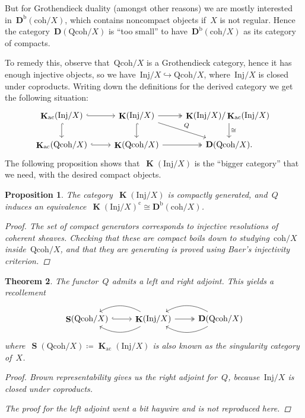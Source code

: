 \documentclass[10pt,a4paper]{article}
\theoremstyle{lecture}
\newtheorem{theorem}{Theorem}
\newtheorem{proposition}[theorem]{Proposition}
\newcommand\ac{\ensuremath{\mathrm{ac}}}
\newcommand\bounded{\ensuremath{\mathrm{b}}}
\newcommand\cc{\ensuremath{\mathrm{c}}}
\newcommand\coh{\ensuremath{\mathrm{coh}}}
\newcommand\derived{\ensuremath{\mathbf{D}}}
\newcommand\Inj{\ensuremath{\mathrm{Inj}}}
\newcommand\Qcoh{\ensuremath{\mathrm{Qcoh}}}
\DeclareMathOperator\KKK{\mathbf{K}}
\DeclareMathOperator\SSing{\mathbf{S}}
\begin{document}
But for Grothendieck duality (amongst other reasons) we are mostly interested in~$\derived^\bounded(\coh/X)$, which contains noncompact objects  if~$X$ is not regular. Hence the category~$\derived(\Qcoh/X)$ is ``too small'' to have~$\derived^\bounded(\coh/X)$ as its category of compacts.

To remedy this, observe that~$\Qcoh/X$ is a Grothendieck category, hence it has enough injective objects, so we have~$\Inj/X\hookrightarrow\Qcoh/X$, where~$\Inj/X$ is closed under coproducts. Writing down the definitions for the derived category we get the following situation:
\begin{equation}
  \begin{tikzcd}
    \KKK_\ac(\Inj/X) \arrow[hook]{r} \arrow[hook]{d} & \KKK(\Inj/X) \arrow[hook]{d} \arrow[two heads]{r} \arrow{rd}{Q} & \KKK(\Inj/X)/\KKK_\ac(\Inj/X) \arrow{d}{\cong} \\
    \KKK_\ac(\Qcoh/X) \arrow[hook]{r} & \KKK(\Qcoh/X) \arrow[two heads]{r} & \derived(\Qcoh/X).
  \end{tikzcd}
\end{equation}
The following proposition shows that~$\KKK(\Inj/X)$ is the ``bigger category'' that we need, with the desired compact objects.
\begin{proposition}
  The category~$\KKK(\Inj/X)$ is compactly generated, and~$Q$ induces an equivalence~$\KKK(\Inj/X)^\cc\cong\derived^\bounded(\coh/X)$.
  \begin{proof}
    The set of compact generators corresponds to injective resolutions of coherent sheaves. Checking that these are compact boils down to studying~$\coh/X$ inside~$\Qcoh/X$, and that they are generating is proved using Baer's injectivity criterion.
  \end{proof}
\end{proposition}
\begin{theorem}
  The functor~$Q$ admits a left and right adjoint. This yields a recollement
  \begin{equation}
    \begin{tikzcd}
      \SSing(\Qcoh/X) \arrow[hook]{r} & \KKK(\Inj/X) \arrow[bend right, swap]{l} \arrow[bend left]{l} \arrow[two heads]{r} & \derived(\Qcoh/X) \arrow[bend right, swap]{l} \arrow[bend left]{l}
    \end{tikzcd}
  \end{equation}
  where~$\SSing(\Qcoh/X)\coloneqq\KKK_\ac(\Inj/X)$ is also known as the singularity category of~$X$.

  \begin{proof}
    Brown representability gives us the right adjoint for~$Q$, because~$\Inj/X$ is closed under coproducts.

    The proof for the left adjoint went a bit haywire and is not reproduced here.
  \end{proof}
\end{theorem}
\end{document}
